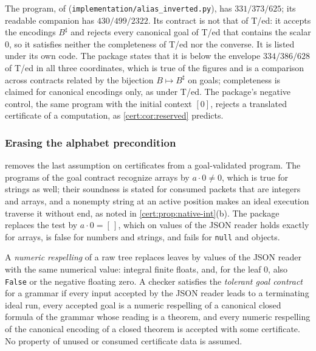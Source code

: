 The program, of  (\texttt{implementation/alias\_inverted.py}),
has $331/373/625$; its readable companion has $430/499/2322$. Its contract is
not that of T/ed: it accepts the encodings $B^{\sharp}$ and rejects every
canonical goal of T/ed that contains the scalar $0$, so it satisfies neither
the completeness of T/ed nor the converse. It is listed under its own code. The
package states that it is below the envelope $334/386/628$ of T/ed in all three
coordinates, which is true of the figures and is a comparison across contracts
related by the bijection $B\mapsto B^{\sharp}$ on goals; completeness is claimed
for canonical encodings only, as under T/ed. The package's negative control,
the same program with the initial context $[0]$, rejects a translated
certificate of a computation, as \cref{cert:cor:reserved} predicts.

\subsubsection*{Erasing the alphabet precondition}

 removes the last assumption on certificates from a
goal-validated program. The programs of the goal contract recognize arrays by
$a\cdot 0\neq 0$, which is true for strings as well; their soundness is stated
for consumed packets that are integers and arrays, and a nonempty string at an
active position makes an ideal execution traverse it without end, as noted in
\cref{cert:prop:native-int}(b). The package replaces the test by
$a\cdot 0=[\,]$, which on values of the JSON reader holds exactly for arrays,
is false for numbers and strings, and fails for \texttt{null} and objects.

\begin{definition}\label{cert:def:tolerant}
A \emph{numeric respelling} of a raw tree replaces leaves by values of the JSON
reader with the same numerical value: integral finite floats, and, for the
leaf $0$, also \texttt{False} or the negative floating zero. A checker
satisfies the \emph{tolerant goal contract} for a grammar if every input
accepted by the JSON reader leads to a terminating ideal run, every accepted
goal is a numeric respelling of a canonical closed formula of the grammar whose
reading is a theorem, and every numeric respelling of the canonical encoding of
a closed theorem is accepted with some certificate. No property of unused or
consumed certificate data is assumed.
\end{definition}

